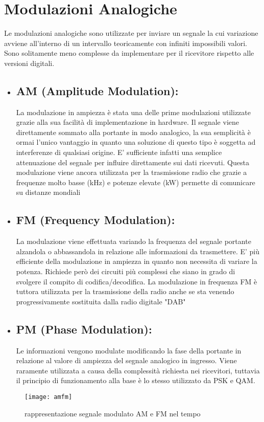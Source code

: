 \section{Modulazioni Analogiche}
Le modulazioni analogiche sono utilizzate per inviare un segnale la cui variazione avviene all'interno di un intervallo teoricamente con infiniti impossibili valori. Sono solitamente meno complesse da implementare per il ricevitore rispetto alle versioni digitali.
\label{sec:context}
\begin{itemize}
   	\item \subsection{AM (Amplitude Modulation): } La modulazione in ampiezza è stata una delle prime modulazioni utilizzate grazie alla sua facilità di implementazione in hardware. Il segnale viene direttamente sommato alla portante in modo analogico, la sua semplicità è ormai l'unico vantaggio in quanto una soluzione di questo tipo è soggetta ad interferenze di qualsiasi origine. E' sufficiente infatti una semplice attenuazione del segnale per influire direttamente sui dati ricevuti. Questa modulazione viene ancora utilizzata per la trasmissione radio che grazie a frequenze molto basse (kHz) e potenze elevate (kW) permette di comunicare su distanze mondiali
   \item \subsection{FM (Frequency Modulation): } La modulazione viene effettuata variando la frequenza del segnale portante alzandola o abbassandola in relazione alle informazioni da trasmettere. E' più efficiente della modulazione in ampiezza in quanto non necessita di variare la potenza. Richiede però dei circuiti più complessi che siano in grado di svolgere il compito di codifica/decodifica. La modulazione in frequenza FM è tuttora utilizzata per la trasmissione della radio anche se sta venendo progressivamente sostituita dalla radio digitale "DAB"
   \item \subsection{PM (Phase Modulation): } Le informazioni vengono modulate modificando la fase della portante in relazione al valore di ampiezza del segnale analogico in ingresso. Viene raramente utilizzata a causa della complessità richiesta nei ricevitori, tuttavia il principio di funzionamento alla base è lo stesso utilizzato da PSK e QAM.
  \end{itemize}
\begin{figure}[h]
	\centering
	\texttt{[image: amfm]}
	\caption{rappresentazione segnale modulato AM e FM nel tempo}\label{fig:1}
\end{figure}



